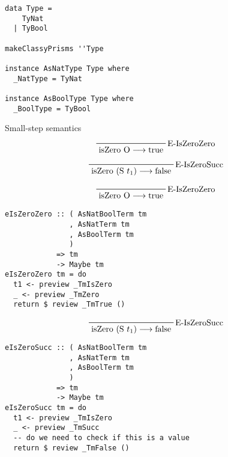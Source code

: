 \documentclass{beamer}
\begin{document}
\begin{frame}[fragile]
\begin{verbatim}
data Type =
    TyNat
  | TyBool

makeClassyPrisms ''Type

instance AsNatType Type where
  _NatType = TyNat

instance AsBoolType Type where
  _BoolType = TyBool
\end{verbatim}
\end{frame}

\begin{frame}[c]
  Small-step semantics
  \begin{displaymath}  
    \prftree[r]{E-IsZeroZero}
    {\text{isZero O} \longrightarrow \text{true}}
  \end{displaymath}  
  \begin{displaymath}  
    \prftree[r]{E-IsZeroSucc}
    {\text{isZero (S $t_1$)} \longrightarrow \text{false}}
  \end{displaymath}  
\end{frame}

\begin{frame}[fragile]
  \begin{displaymath}  
    \prftree[r]{E-IsZeroZero}
    {\text{isZero O} \longrightarrow \text{true}}
  \end{displaymath}  
\begin{verbatim}
eIsZeroZero :: ( AsNatBoolTerm tm
               , AsNatTerm tm
               , AsBoolTerm tm
               )
            => tm 
            -> Maybe tm
eIsZeroZero tm = do
  t1 <- preview _TmIsZero
  _ <- preview _TmZero
  return $ review _TmTrue ()
\end{verbatim}
\end{frame}

\begin{frame}[fragile]
  \begin{displaymath}  
    \prftree[r]{E-IsZeroSucc}
    {\text{isZero (S $t_1$)} \longrightarrow \text{false}}
  \end{displaymath}  
\begin{verbatim}
eIsZeroSucc :: ( AsNatBoolTerm tm
               , AsNatTerm tm
               , AsBoolTerm tm
               )
            => tm 
            -> Maybe tm
eIsZeroSucc tm = do
  t1 <- preview _TmIsZero
  _ <- preview _TmSucc
  -- do we need to check if this is a value
  return $ review _TmFalse ()
\end{verbatim}
\end{frame}
\end{document}
